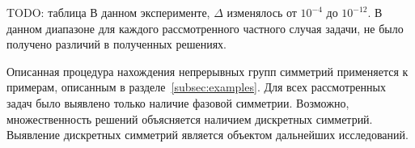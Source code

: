 TODO: таблица
В данном эксперименте, $\Delta$ изменялось от $ 10^{-4} $ до $ 10^{-12} $. В данном диапазоне для каждого рассмотренного частного случая задачи, не было получено различий в полученных решениях.


Описанная процедура нахождения непрерывных групп симметрий применяется к примерам, описанным в разделе~\ref{subsec:examples}. Для всех рассмотренных задач было выявлено только наличие фазовой симметрии. Возможно, множественность решений объясняется наличием дискретных симметрий. Выявление дискретных симметрий является объектом дальнейших исследований.
